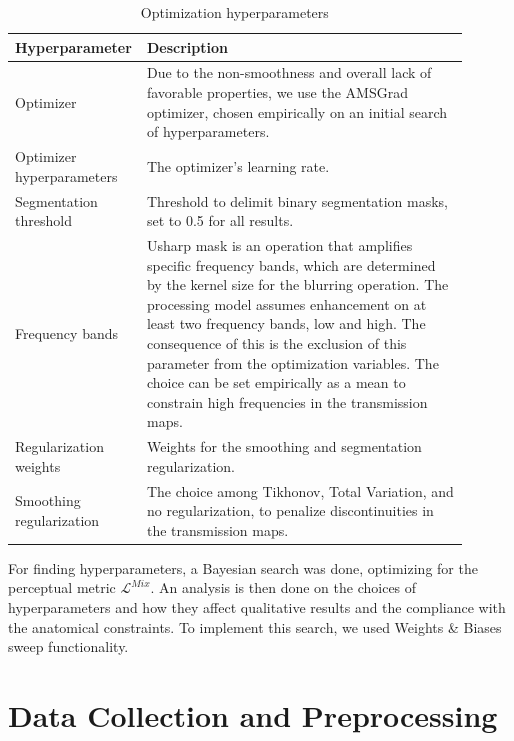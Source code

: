 \documentclass[nomenclature, english, bibtex]{kththesis}
\numberwithin{listing}{chapter}
\begin{document}
\begin{table}[H]
    \centering
    \begin{tabular}{ | p{0.2\linewidth} | p{0.7\linewidth}| }
        \hline
        \textbf{Hyperparameter} & \textbf{Description} \\
        \hline
        Optimizer & Due to the non-smoothness and overall lack of favorable properties, we
       use the AMSGrad \cite{reddiConvergenceAdam2019} optimizer, chosen empirically on an initial search of hyperparameters. \\
        \hline
        Optimizer hyperparameters & The optimizer's learning rate. \\
        \hline
        Segmentation threshold & Threshold to delimit binary segmentation masks, set to 0.5 for all results. \\
        \hline
        Frequency bands & Usharp mask is an operation that amplifies specific frequency bands, which are determined
        by the kernel size for the blurring operation. The processing model assumes enhancement on at least two
        frequency bands, low and high. The consequence of this is the exclusion of this parameter from the optimization
        variables. The choice can be set empirically as a mean to constrain high frequencies in the transmission maps.  \\
        \hline
        Regularization weights & Weights for the smoothing and segmentation regularization. \\
        \hline
        Smoothing regularization & The choice among Tikhonov, Total Variation, and no regularization,
        to penalize discontinuities in the transmission maps. \\
        \hline
    \end{tabular}
    \caption{Optimization hyperparameters}
    \label{tab:hyperparametersList}
\end{table}

For finding hyperparameters, a Bayesian search was done, optimizing for the perceptual metric $\mathcal{L}^{Mix}$.
An analysis is then done on the choices of hyperparameters and how they affect qualitative results and
the compliance with the anatomical constraints. To implement this search, we used Weights \& Biases \cite{wandb} sweep
functionality.

\section{Data Collection and Preprocessing}
\label{sec:dataCollection}
\end{document}

